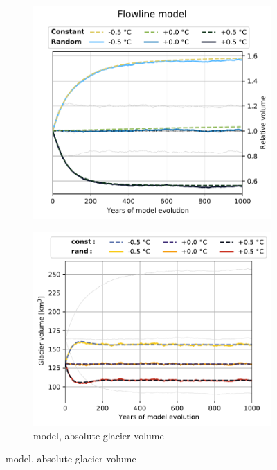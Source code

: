 \begin{figure}[t!]
\begin{subfigure}[b]{0.48\textwidth}
            \includegraphics[width=\textwidth]{../plots/final_plots/time_series/histalp_commitment/volume_norm_fl.pdf}
          \end{subfigure}
          \begin{subfigure}[b]{0.48\textwidth}
            \caption{\Vas{} model, absolute glacier volume}
            \label{fig:histalp_commitment:volume_abs_const}
            \centering
            \includegraphics[width=\textwidth]{../plots/final_plots/time_series/histalp_commitment/volume_abs_vas.pdf}

\end{subfigure}
\end{figure}
